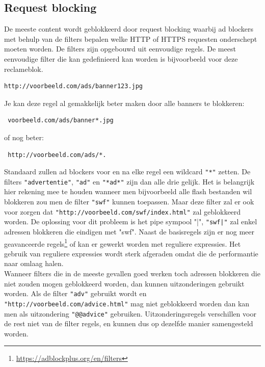 \documentclass[pdftex,a4paper,12pt,twoside]{report}
\begin{document}
\subsection{Request blocking}
\label{sec:Request blocking}
De meeste content wordt geblokkeerd door request blocking waarbij ad blockers met behulp van de filters bepalen welke HTTP of HTTPS requesten onderschept moeten worden. De filters zijn opgebouwd uit eenvoudige regels. De meest eenvoudige filter die kan gedefinieerd kan worden is bijvoorbeeld voor deze reclameblok.
\lstset{language=Html,tabsize=2}  
\begin{lstlisting}
http://voorbeeld.com/ads/banner123.jpg
\end{lstlisting}
Je kan deze regel al gemakkelijk beter maken door alle banners te blokkeren:
\lstset{language=Html,tabsize=2}  
\begin{lstlisting}
 voorbeeld.com/ads/banner*.jpg 
\end{lstlisting}
 of nog beter:
\lstset{language=Html,tabsize=2}  
\begin{lstlisting}
 http://voorbeeld.com/ads/*.
\end{lstlisting}
Standaard zullen ad blockers voor en na elke regel een wildcard \texttt{"*"} zetten. De filters \texttt{"advertentie"}, \texttt{"ad"} en \texttt{"*ad*"} zijn dan alle drie gelijk. Het is belangrijk hier rekening mee te houden wanneer men bijvoorbeeld alle flash bestanden wil blokkeren zou men de filter \texttt{"swf"} kunnen toepassen. Maar deze filter zal er ook voor zorgen dat \texttt{"http://voorbeeld.com/swf/index.html"} zal geblokkeerd worden. De oplossing voor dit probleem is het pipe sympool "|", \texttt{"swf|"} zal enkel adressen blokkeren die eindigen met "swf". 
Naast de basisregels zijn er nog meer geavanceerde regels\footnote{\url{https://adblockplus.org/en/filters}} of kan er gewerkt worden met reguliere expressies. Het gebruik van reguliere expressies wordt sterk afgeraden omdat die de performantie naar omlaag halen.
\\
Wanneer filters die in de meeste gevallen goed werken toch adressen blokkeren die niet zouden mogen geblokkeerd worden, dan kunnen uitzonderingen gebruikt worden. Als de filter \texttt{"adv"} gebruikt wordt en \texttt{"http://voorbeeld.com/advice.html"} mag niet geblokkeerd worden dan kan men als uitzondering \texttt{"@@advice"} gebruiken. Uitzonderingsregels verschillen voor de rest niet van de filter regels, en kunnen dus op dezelfde manier samengesteld worden.
\end{document}
